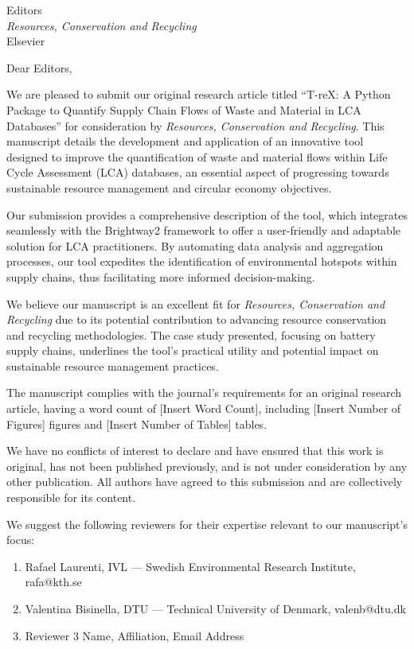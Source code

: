 \documentclass[10pt]{letter}
\begin{document}
\thispagestyle{empty}
\begin{letter}{Editors\\\textit{Resources, Conservation and Recycling}\\Elsevier}

\opening{Dear Editors,}

We are pleased to submit our original research article titled ``T-reX: A Python Package to Quantify Supply Chain Flows of Waste and Material in LCA Databases'' for consideration by \textit{Resources, Conservation and Recycling}. This manuscript details the development and application of an innovative tool designed to improve the quantification of waste and material flows within Life Cycle Assessment (LCA) databases, an essential aspect of progressing towards sustainable resource management and circular economy objectives.

Our submission provides a comprehensive description of the tool, which integrates seamlessly with the Brightway2 framework to offer a user-friendly and adaptable solution for LCA practitioners. By automating data analysis and aggregation processes, our tool expedites the identification of environmental hotspots within supply chains, thus facilitating more informed decision-making.

We believe our manuscript is an excellent fit for \textit{Resources, Conservation and Recycling} due to its potential contribution to advancing resource conservation and recycling methodologies. The case study presented, focusing on battery supply chains, underlines the tool's practical utility and potential impact on sustainable resource management practices.

The manuscript complies with the journal's requirements for an original research article, having a word count of [Insert Word Count], including [Insert Number of Figures] figures and [Insert Number of Tables] tables.

We have no conflicts of interest to declare and have ensured that this work is original, has not been published previously, and is not under consideration by any other publication. All authors have agreed to this submission and are collectively responsible for its content. 

\vspace{1em}

We suggest the following reviewers for their expertise relevant to our manuscript's focus:

\begin{enumerate}
    \item {Rafael Laurenti, IVL --- Swedish Environmental Research Institute, rafa@kth.se}
    \item {Valentina Bisinella,  DTU --- Technical University of Denmark, valenb@dtu.dk}
    \item {Reviewer 3 Name, Affiliation, Email Address}
\end{enumerate}
\vspace{1em}


\end{letter}
\end{document}
